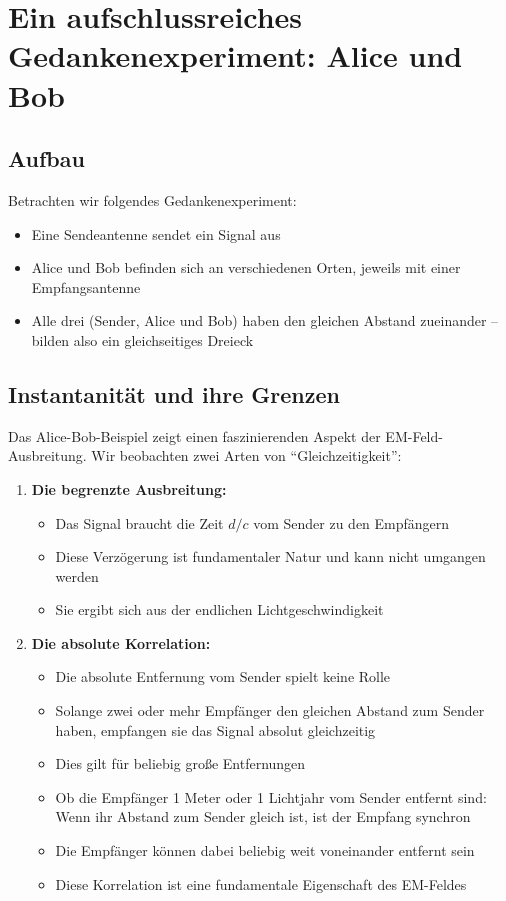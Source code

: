\documentclass[12pt,a4paper]{article}
\begin{document}
	\section{Ein aufschlussreiches Gedankenexperiment: Alice und Bob}
	\subsection{Aufbau}
	Betrachten wir folgendes Gedankenexperiment:
	\begin{itemize}
		\item Eine Sendeantenne sendet ein Signal aus
		\item Alice und Bob befinden sich an verschiedenen Orten, jeweils mit einer Empfangsantenne
		\item Alle drei (Sender, Alice und Bob) haben den gleichen Abstand zueinander -- bilden also ein gleichseitiges Dreieck
	\end{itemize}
	
	\subsection{Instantanität und ihre Grenzen}
	Das Alice-Bob-Beispiel zeigt einen faszinierenden Aspekt der EM-Feld-Ausbreitung. Wir beobachten zwei Arten von ``Gleichzeitigkeit'':
	
	\begin{enumerate}
		\item \textbf{Die begrenzte Ausbreitung:}
		\begin{itemize}
			\item Das Signal braucht die Zeit $d/c$ vom Sender zu den Empfängern
			\item Diese Verzögerung ist fundamentaler Natur und kann nicht umgangen werden
			\item Sie ergibt sich aus der endlichen Lichtgeschwindigkeit
		\end{itemize}
		
		\item \textbf{Die absolute Korrelation:}
		\begin{itemize}
			\item Die absolute Entfernung vom Sender spielt keine Rolle
			\item Solange zwei oder mehr Empfänger den gleichen Abstand zum Sender haben, empfangen sie das Signal absolut gleichzeitig
			\item Dies gilt für beliebig große Entfernungen
			\item Ob die Empfänger 1 Meter oder 1 Lichtjahr vom Sender entfernt sind: Wenn ihr Abstand zum Sender gleich ist, ist der Empfang synchron
			\item Die Empfänger können dabei beliebig weit voneinander entfernt sein
			\item Diese Korrelation ist eine fundamentale Eigenschaft des EM-Feldes
		\end{itemize}
	\end{enumerate}
	
\end{document}
